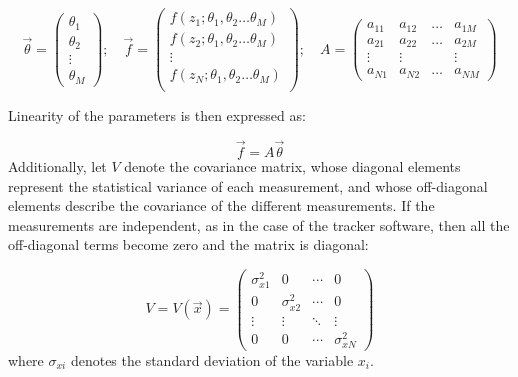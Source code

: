\vspace{3mm}
\begin{equation}
  \vec{\theta} = 
    \begin{pmatrix}
      \theta_1 \\
      \theta_2 \\
      \vdots \\
      \theta_M
    \end{pmatrix}
  \mathrm{;} \quad
  \vec{f} = 
    \begin{pmatrix}
      f\left( z_1; \theta_1, \theta_2 \ldots \theta_M \right) \\
      f\left( z_2; \theta_1, \theta_2 \ldots \theta_M \right) \\
      \vdots \\
      f\left( z_N; \theta_1, \theta_2 \ldots \theta_M \right) \\
    \end{pmatrix}
  \mathrm{;} \quad
  A = 
    \begin{pmatrix}
      a_{11} & a_{12} & \ldots & a_{1M} \\
      a_{21} & a_{22} & \ldots & a_{2M} \\
      \vdots & \vdots &  & \vdots \\
      a_{N1} & a_{N2} & \ldots & a_{NM}
    \end{pmatrix}
\end{equation}

\vspace{3mm}
\noindent
Linearity of the parameters is then expressed as: 

\begin{equation}
  \label{eqn:LinearityOfParamtersMatrixForm}
  \vec{f} = A \vec{\theta}
\end{equation}
Additionally, let $V$ denote the covariance matrix, whose diagonal elements represent the statistical variance of each measurement, and whose off-diagonal elements describe the covariance of the different measurements. If the measurements are independent, as in the case of the tracker software, then all the off-diagonal terms become zero and the matrix is diagonal:

\begin{equation}
  V = V \left(\vec{x} \right) =
  \begin{pmatrix}
    \sigma_{x1} ^2 & 0 & \cdots & 0 \\
    0 & \sigma_{x2} ^2 & \cdots & 0 \\
    \vdots & \vdots  & \ddots & \vdots  \\
    0  & 0 & \cdots & \sigma_{xN} ^2
  \end{pmatrix}
\end{equation}
where $\sigma_{xi}$ denotes the standard deviation of the variable $x_i$.

